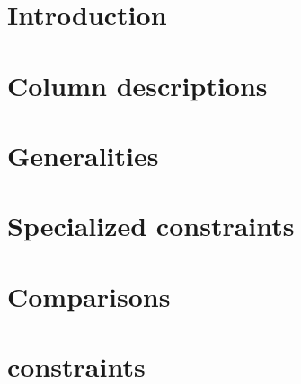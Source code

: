 
\section{Introduction}                   \label{rlp auth: intro}                           
\section{Column descriptions}            \label{rlp auth: column descriptions}             
\section{Generalities}                   \label{rlp auth: generalities}                    
\section{Specialized constraints}        \label{rlp auth: specialized constraints}         
\section{Comparisons}                    \label{rlp auth: comparisons}                     
\section{\rlpUtilsMod{} constraints}     \label{rlp auth: rlp utils}                       
